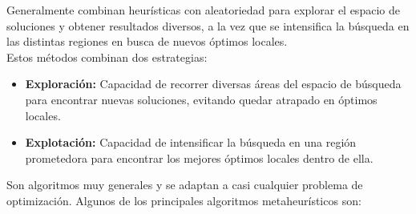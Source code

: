 \documentclass[12pt,a4paper]{book}
\begin{document}
Generalmente combinan heurísticas con aleatoriedad para explorar el espacio de soluciones y obtener resultados diversos, a la vez que se intensifica la búsqueda en las distintas regiones en busca de nuevos óptimos locales.\\
Estos métodos combinan dos estrategias:
\begin{itemize}
    \item \textbf{Exploración:} Capacidad de recorrer diversas áreas del espacio de búsqueda para encontrar nuevas soluciones, evitando quedar atrapado en óptimos locales.
    \item \textbf{Explotación:} Capacidad de intensificar la búsqueda en una región prometedora para encontrar los mejores óptimos locales dentro de ella.
\end{itemize}

Son algoritmos muy generales y se adaptan a casi cualquier problema de optimización. Algunos de los principales algoritmos metaheurísticos son:
\end{document}
